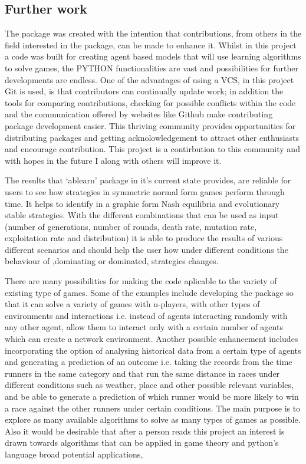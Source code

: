 \subsection{Further work}

The package was created with the intention that contributions, from others in the field interested in the package, can be made to enhance it. Whilst in this project a code was built for creating agent based models that will use learning algorithms to solve games, the PYTHON functionalities are vast and possibilities for further developments are endless. One of the advantages of using a VCS, in this project Git is used,  is that contributors can continually update work; in addition the tools for comparing contributions, checking for possible conflicts within the code and the communication offered by websites like Github make contributing package development easier. This thriving community provides opportunities for distributing packages and getting acknolowledgement to attract other enthusiasts and encourage contribution. This project is a contirbution to this community and with hopes in the future I along with others will improve it.

The results that `ablearn' package in it's current state provides, are reliable for users to see how strategies in symmetric normal form games perform through time. It helps to identify in a graphic form Nash equilibria and evolutionary stable strategies. With the different combinations that can be used as input (number of generations, number of rounds, death rate, mutation rate, exploitation rate and distribution) it is able to produce the results of various different scenarios and should help the user how under different conditions the behaviour of ,dominating or dominated, strategies changes.

There are many possibilities for making the code aplicable to the variety of existing type of games. Some of the examples include developing the package so that it can solve a variety of games with n-players, with other types of environments and interactions i.e. instead of agents interacting randomly with any other agent, allow them to interact only with a certain number of agents which can create a network environment. Another possible enhancement includes incorporating the option of analysing historical data from a certain type of agents and generating a prediction of an outcome i.e. taking the records from the time runners in the same category and that run the same distance in races under different conditions such as weather, place and other possible relevant variables, and be able to generate a prediction of which runner would be more likely to win a race against the other runners under certain conditions. 
The main purpose is to explore as many available algorithms to solve as many types of games as possible. Also it would be desirable that after a person reads this project an interest is drawn towards algorithms that can be applied in game theory and python's language broad potential applications, 

